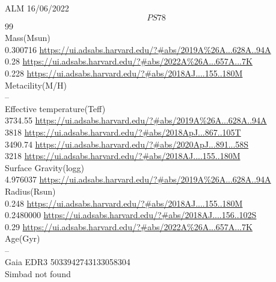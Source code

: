 ALM 16/06/2022\\
\[PS78\] 99 \\
Mass(Msun)\\
0.300716 \url{https://ui.adsabs.harvard.edu/?#abs/2019A%26A...628A..94A}\\
0.28 \url{https://ui.adsabs.harvard.edu/?#abs/2022A%26A...657A...7K}\\
0.228 \url{https://ui.adsabs.harvard.edu/?#abs/2018AJ....155..180M}\\
Metacility(M/H)\\
--\\
Effective temperature(Teff)\\
3734.55 \url{https://ui.adsabs.harvard.edu/?#abs/2019A%26A...628A..94A}\\
3818 \url{https://ui.adsabs.harvard.edu/?#abs/2018ApJ...867..105T}\\
3490.74 \url{https://ui.adsabs.harvard.edu/?#abs/2020ApJ...891...58S}\\
3218 \url{https://ui.adsabs.harvard.edu/?#abs/2018AJ....155..180M}\\
Surface Gravity(logg)\\
4.976037 \url{https://ui.adsabs.harvard.edu/?#abs/2019A%26A...628A..94A}\\
Radius(Rsun)\\
0.248 \url{https://ui.adsabs.harvard.edu/?#abs/2018AJ....155..180M}\\
0.2480000 \url{https://ui.adsabs.harvard.edu/?#abs/2018AJ....156..102S}\\
0.29 \url{https://ui.adsabs.harvard.edu/?#abs/2022A%26A...657A...7K}\\
Age(Gyr)\\
--\\
Gaia EDR3 5033942743133058304\\
Simbad not found\\
